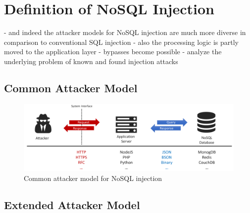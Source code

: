 \section{Definition of NoSQL Injection}

- and indeed the attacker models for NoSQL injection are much more diverse in comparison to conventional SQL injection
- also the processing logic is partly moved to the application layer
- bypasses become possible
- analyze the underlying problem of known and found injection attacks


\subsection{Common Attacker Model}


\begin{figure}[h]
\centering
  \includegraphics[width=1\linewidth]{Images/attacker_model_normal}
  \caption{Common attacker model for NoSQL injection}
  \label{fig:normalAttackerModel}
\end{figure}


\subsection{Extended Attacker Model}


